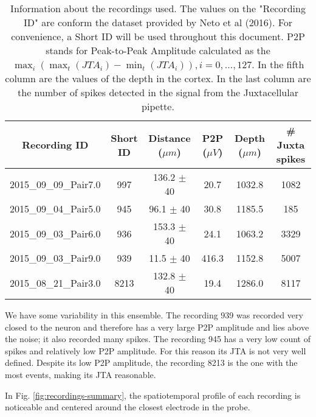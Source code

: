 \begin{table}[!h]
\centering
\begin{tabular}{|c|c|c|c|c|c|}
\hline
\textbf{Recording ID} & \textbf{Short ID} & \textbf{Distance ($\mu m$) } & \textbf{P2P ($\mu V$)} & \textbf{Depth ($\mu m$)} & \textbf{\# Juxta spikes}\\ \hline
2015\_09\_09\_Pair7.0 & 997 & 136.2 $\pm$ 40 & 20.7 & 1032.8 & 1082  \\ \hline
2015\_09\_04\_Pair5.0 & 945 & 96.1 $\pm$ 40 & 30.8 & 1185.5 & 185  \\ \hline
2015\_09\_03\_Pair6.0 & 936 & 153.3 $\pm$  40 & 24.1 & 1063.2 & 3329 \\ \hline
2015\_09\_03\_Pair9.0 & 939 & 11.5 $\pm$  40 & 416.3 & 1152.8 & 5007  \\ \hline
2015\_08\_21\_Pair3.0 & 8213 & 132.8 $\pm$ 40 & 19.4 & 1286.0 & 8117 \\ \hline
\end{tabular}
\caption{Information about the recordings used. The values on the "Recording ID" are conform the dataset provided by Neto et al (2016). For convenience, a Short ID will be used throughout this document. P2P stands for Peak-to-Peak Amplitude calculated as the $\max_i \left( \max_t \left( JTA_i \right) - \min_t \left( JTA_i \right)\right), i=0,\ldots , 127$. In the fifth column are the values of the depth in the cortex. In the last column are the number of spikes detected in the signal from the Juxtacellular pipette.}
\label{tab:sum-recordings}
\end{table}

We have some variability in this ensemble. 
The recording 939 was recorded very closed to the neuron and therefore has a very large P2P amplitude and lies above the noise; it also recorded many spikes. 
The recording 945 has a very low count of spikes and relatively low P2P amplitude. For this reason its JTA is not very well defined.
Despite its low P2P amplitude, the recording 8213 is the one with the most events, making its JTA reasonable.

In Fig. \ref{fig:recordings-summary}, the spatiotemporal profile of each recording is noticeable and centered around the closest electrode in the probe.
